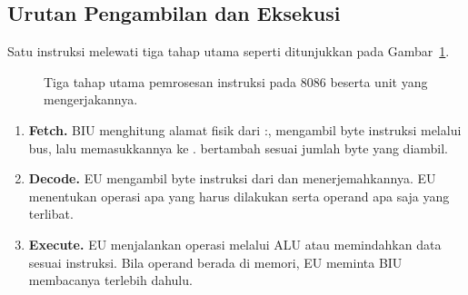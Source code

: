 \subsection{Urutan Pengambilan dan Eksekusi}

Satu instruksi melewati tiga tahap utama seperti ditunjukkan pada
Gambar~\ref{fig:siklus-instruksi}.

\begin{figure}[H]
    \centering
    \caption{Tiga tahap utama pemrosesan instruksi pada 8086 beserta
    unit yang mengerjakannya.}
    \label{fig:siklus-instruksi}
\end{figure}

\begin{enumerate}
    \item \textbf{Fetch.} BIU menghitung alamat fisik dari
          :, mengambil byte instruksi melalui bus,
          lalu memasukkannya ke .  bertambah
          sesuai jumlah byte yang diambil.

    \item \textbf{Decode.} EU mengambil byte instruksi dari
           dan menerjemahkannya. EU menentukan operasi
          apa yang harus dilakukan serta operand apa saja yang
          terlibat.

    \item \textbf{Execute.} EU menjalankan operasi melalui ALU atau
          memindahkan data sesuai instruksi. Bila operand berada di
          memori, EU meminta BIU membacanya terlebih dahulu.
\end{enumerate}

